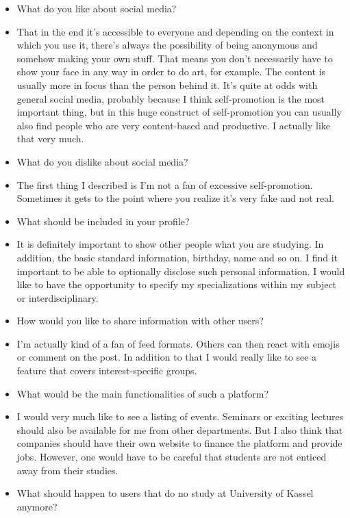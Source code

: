 {\begin{itemize}[]
    \item {} What do you like about social media?
    \item {} That in the end it's accessible to everyone and depending on the context in which you use it, there's always the possibility of being anonymous and somehow making your own stuff. That means you don't necessarily have to show your face in any way in order to do art, for example. The content is usually more in focus than the person behind it. It's quite at odds with general social media, probably because I think self-promotion is the most important thing, but in this huge construct of self-promotion you can usually also find people who are very content-based and productive. I actually like that very much.
    \item {} What do you dislike about social media?
    \item {} The first thing I described is I'm not a fan of excessive self-promotion. Sometimes it gets to the point where you realize it's very fake and not real.
    \item {} What should be included in your profile?
    \item {} It is definitely important to show other people what you are studying. In addition, the basic standard information, birthday, name and so on. I find it important to be able to optionally disclose such personal information. I would like to have the opportunity to specify my specializations within my subject or interdisciplinary.
    \item {} How would you like to share information with other users?
    \item {} I'm actually kind of a fan of feed formats. Others can then react with emojis or comment on the post. In addition to that I would really like to see a feature that covers interest-specific groups.
    \item {} What would be the main functionalities of such a platform?
    \item {} I would very much like to see a listing of events. Seminars or exciting lectures should also be available for me from other departments. But I also think that companies should have their own website to finance the platform and provide jobs. However, one would have to be careful that students are not enticed away from their studies.
    \item {} What should happen to users that do no study at University of Kassel anymore?

\end{itemize}}
